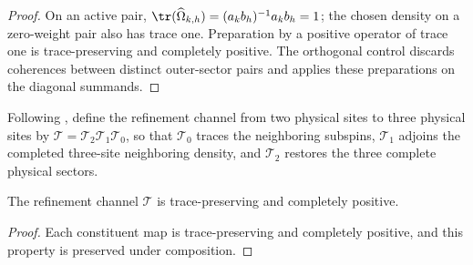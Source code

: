 \begin{proof}
    \leanok
    On an active pair,
    $\tr(\widehat\Omega_{k,h})=(a_kb_h)^{-1}a_kb_h=1$; the chosen density on
    a zero-weight pair also has trace one. Preparation by a positive operator
    of trace one is trace-preserving and completely positive. The orthogonal
    control discards coherences between distinct outer-sector pairs and
    applies these preparations on the diagonal summands.
\end{proof}

\begin{definition}
    \label{def:mpdo_physical_sector_t_map}
    \leanok
    Following \cite[Appendix~C.2, lines~1522--1545]{Cirac2016MPDO_arXiv},
    define the refinement channel from two physical sites to three physical
    sites by $\mathcal T=\mathcal T_2\mathcal T_1\mathcal T_0$, so that
    $\mathcal T_0$ traces the neighboring subspins, $\mathcal T_1$ adjoins the
    completed three-site neighboring density, and $\mathcal T_2$ restores the
    three complete physical sectors.
\end{definition}

\begin{lemma}
    \label{thm:mpdo_physical_sector_t_map_cptp}
    \leanok
    The refinement channel $\mathcal T$ is trace-preserving and completely
    positive.
\end{lemma}

\begin{proof}
    \leanok
    Each constituent map is trace-preserving and completely positive, and
    this property is preserved under composition.
\end{proof}

